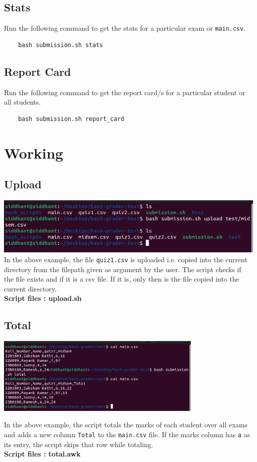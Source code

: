 \documentclass{article}
\begin{document}
\subsection{Stats}
Run the following command to get the stats for a particular exam or \verb"main.csv".
\begin{verbatim}
    bash submission.sh stats
\end{verbatim}

\subsection{Report Card}
Run the following command to get the report card/s for a particular student or all students.  
\begin{verbatim}
    bash submission.sh report_card
\end{verbatim}

\section{Working}
\subsection{Upload}
\includegraphics[width=\textwidth]{upload.png}
In the above example, the file \verb"quiz1.csv" is uploaded i.e. copied into the current directory from the filepath given as argument by the user.
The script checks if the file exists and if it is a csv file. If it is, only then is the file copied into the current directory.\\
\textbf{Script files : upload.sh }


\subsection{Total}
\begin{center}
    \includegraphics[width=10cm]{total.png}
\end{center}
In the above example, the script totals the marks of each student over all exams and adds a new column \verb"Total" to the \verb"main.csv" file.
If the marks column has \verb"a" as its entry, the script skips that row while totaling.\\
\textbf{Script files : total.awk }
\end{document}
